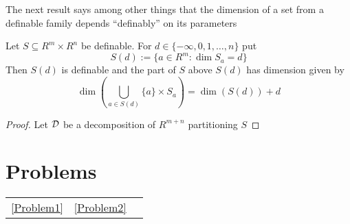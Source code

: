 \documentclass[11pt]{article}
\begin{document}
The next result says among other things that the dimension of a set from a definable family
depends ``definably'' on its parameters

\begin{proposition}[]
Let \(S\subseteq R^m\times R^n\) be definable. For \(d\in\{-\infty,0,1,\dots,n\}\) put
\begin{equation*}
S(d):=\{a\in R^m:\dim S_a=d\}
\end{equation*}
Then \(S(d)\) is definable and the part of \(S\) above \(S(d)\) has dimension given by
\begin{equation*}
\dim\left( \bigcup_{a\in S(d)}\{a\}\times S_a \right)=\dim(S(d))+d
\end{equation*}
\end{proposition}

\begin{proof}
Let \(\mathcal{D}\) be a decomposition of \(R^{m+n}\) partitioning \(S\)
\end{proof}



\section{Problems}
\label{sec:org87442a7}

\begin{center}
\begin{tabular}{lll}
\ref{Problem1} & \ref{Problem2} & \\
\end{tabular}
\end{center}
\end{document}
